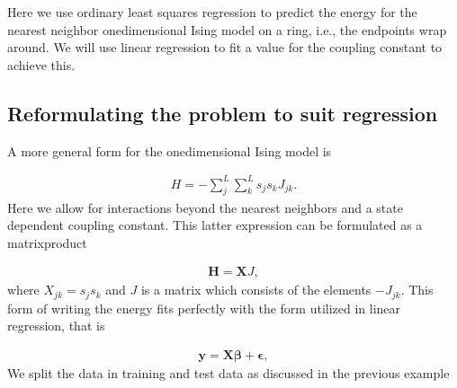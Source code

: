 \documentclass[letterpaper,10pt,english]{sphinxmanual}
\begin{document}
Here we use ordinary least squares
regression to predict the energy for the nearest neighbor
one\sphinxhyphen{}dimensional Ising model on a ring, i.e., the endpoints wrap
around. We will use linear regression to fit a value for
the coupling constant to achieve this.


\subsection{Reformulating the problem to suit regression}
\label{\detokenize{chapter4:reformulating-the-problem-to-suit-regression}}
A more general form for the one\sphinxhyphen{}dimensional Ising model is




\begin{equation*}
\begin{split}
\begin{equation}
    H = - \sum_j^L \sum_k^L s_j s_k J_{jk}.
\label{_auto3} \tag{3}
\end{equation}
\end{split}
\end{equation*}
Here we allow for interactions beyond the nearest neighbors and a state dependent
coupling constant. This latter expression can be formulated as
a matrix\sphinxhyphen{}product




\begin{equation*}
\begin{split}
\begin{equation}
    \boldsymbol{H} = \boldsymbol{X} J,
\label{_auto4} \tag{4}
\end{equation}
\end{split}
\end{equation*}
where \(X_{jk} = s_j s_k\) and \(J\) is a matrix which consists of the
elements \(-J_{jk}\). This form of writing the energy fits perfectly
with the form utilized in linear regression, that is




\begin{equation*}
\begin{split}
\begin{equation}
    \boldsymbol{y} = \boldsymbol{X}\boldsymbol{\beta} + \boldsymbol{\epsilon},
\label{_auto5} \tag{5}
\end{equation}
\end{split}
\end{equation*}
We split the data in training and test data as discussed in the previous example
\end{document}
